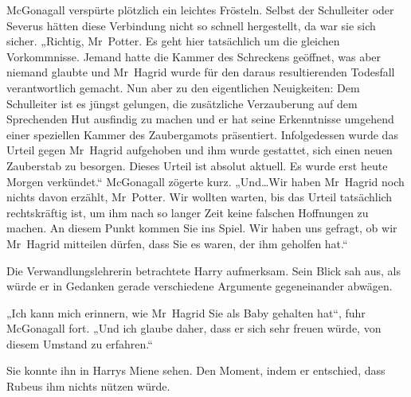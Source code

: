 McGonagall verspürte plötzlich ein leichtes Frösteln. Selbst der Schulleiter oder Severus hätten diese Verbindung nicht so schnell hergestellt, da war sie sich sicher. „Richtig, Mr~Potter. Es geht hier tatsächlich um die gleichen Vorkommnisse. Jemand hatte die Kammer des Schreckens geöffnet, was aber niemand glaubte und Mr~Hagrid wurde für den daraus resultierenden Todesfall verantwortlich gemacht. Nun aber zu den eigentlichen Neuigkeiten: Dem Schulleiter ist es jüngst gelungen, die zusätzliche Verzauberung auf dem Sprechenden Hut ausfindig zu machen und er hat seine Erkenntnisse umgehend einer speziellen Kammer des Zaubergamots präsentiert. Infolgedessen wurde das Urteil gegen Mr~Hagrid aufgehoben und ihm wurde gestattet, sich einen neuen Zauberstab zu besorgen. Dieses Urteil ist absolut aktuell. Es wurde erst heute Morgen verkündet.“ McGonagall zögerte kurz. „Und…Wir haben Mr~Hagrid noch nichts davon erzählt, Mr~Potter. Wir wollten warten, bis das Urteil tatsächlich rechtskräftig ist, um ihm nach so langer Zeit keine falschen Hoffnungen zu machen. An diesem Punkt kommen Sie ins Spiel. Wir haben uns gefragt, ob wir Mr~Hagrid mitteilen dürfen, dass Sie es waren, der ihm geholfen hat.“

Die Verwandlungslehrerin betrachtete Harry aufmerksam. Sein Blick sah aus, als würde er in Gedanken gerade verschiedene Argumente gegeneinander abwägen.

„Ich kann mich erinnern, wie Mr~Hagrid Sie als Baby gehalten hat“, fuhr McGonagall fort. „Und ich glaube daher, dass er sich sehr freuen würde, von diesem Umstand zu erfahren.“

Sie konnte ihn in Harrys Miene sehen. Den Moment, indem er entschied, dass Rubeus ihm nichts nützen würde.


